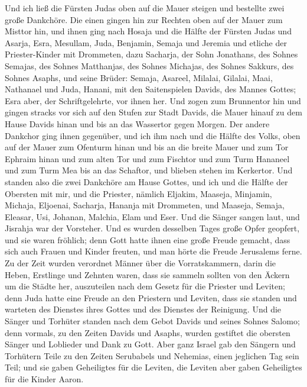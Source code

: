  Und ich ließ die Fürsten Judas oben auf die Mauer
steigen und bestellte zwei große Dankchöre. Die einen gingen hin zur
Rechten oben auf der Mauer zum Misttor hin,  und ihnen
ging nach Hosaja und die Hälfte der Fürsten Judas  und
Asarja, Esra, Mesullam,  Juda, Benjamin, Semaja und
Jeremia  und etliche der Priester-Kinder mit Drommeten,
dazu Sacharja, der Sohn Jonathans, des Sohnes Semajas, des Sohnes
Matthanjas, des Sohnes Michajas, des Sohnes Sakkurs, des Sohnes Asaphs,
 und seine Brüder: Semaja, Asareel, Milalai, Gilalai,
Maai, Nathanael und Juda, Hanani, mit den Saitenspielen Davids, des
Mannes Gottes; Esra aber, der Schriftgelehrte, vor ihnen her.
 Und zogen zum Brunnentor hin und gingen stracks vor sich
auf den Stufen zur Stadt Davids, die Mauer hinauf zu dem Hause Davids
hinan und bis an das Wassertor gegen Morgen.  Der andere
Dankchor ging ihnen gegenüber, und ich ihm nach und die Hälfte des
Volks, oben auf der Mauer zum Ofenturm hinan und bis an die breite Mauer
 und zum Tor Ephraim hinan und zum alten Tor und zum
Fischtor und zum Turm Hananeel und zum Turm Mea bis an das Schaftor, und
blieben stehen im Kerkertor.  Und standen also die zwei
Dankchöre am Hause Gottes, und ich und die Hälfte der Obersten mit mir,
 und die Priester, nämlich Eljakim, Maaseja, Minjamin,
Michaja, Eljoenai, Sacharja, Hananja mit Drommeten,  und
Maaseja, Semaja, Eleasar, Usi, Johanan, Malchia, Elam und Eser. Und die
Sänger sangen laut, und Jisrahja war der Vorsteher.  Und
es wurden desselben Tages große Opfer geopfert, und sie waren fröhlich;
denn Gott hatte ihnen eine große Freude gemacht, dass sich auch Frauen
und Kinder freuten, und man hörte die Freude Jerusalems ferne.
 Zu der Zeit wurden verordnet Männer über die
Vorratskammern, darin die Heben, Erstlinge und Zehnten waren, dass sie
sammeln sollten von den Äckern um die Städte her, auszuteilen nach dem
Gesetz für die Priester und Leviten; denn Juda hatte eine Freude an den
Priestern und Leviten, dass sie standen  und warteten des
Dienstes ihres Gottes und des Dienstes der Reinigung. Und die Sänger und
Torhüter standen nach dem Gebot Davids und seines Sohnes Salomo;
 denn vormals, zu den Zeiten Davids und Asaphs, wurden
gestiftet die obersten Sänger und Loblieder und Dank zu Gott.
 Aber ganz Israel gab den Sängern und Torhütern Teile zu
den Zeiten Serubabels und Nehemias, einen jeglichen Tag sein Teil; und
sie gaben Geheiligtes für die Leviten, die Leviten aber gaben
Geheiligtes für die Kinder Aaron.

